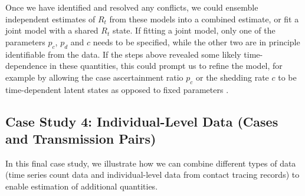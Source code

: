 \documentclass{article}
\begin{document}
\begin{enumerate}
    Once we have identified and resolved any conflicts, we could ensemble independent estimates of $R_t$ from these models into a combined estimate, or fit a joint model with a shared $R_t$ state. If fitting a joint model, only one of the parameters $p_c$, $p_d$ and $c$ needs to be specified, while the other two are in principle identifiable from the data. If the steps above revealed some likely time-dependence in these quantities, this could prompt us to refine the model, for example by allowing the case ascertainment ratio $p_c$ or the shedding rate $c$ to be time-dependent latent states as opposed to fixed parameters \citep{watson2024jointly}. 
\end{enumerate}

\subsection{Case Study 4: Individual-Level Data (Cases and Transmission Pairs)}

In this final case study, we illustrate how we can combine different types of data (time series count data and individual-level data from contact tracing records) to enable estimation of additional quantities. 
\end{document}
